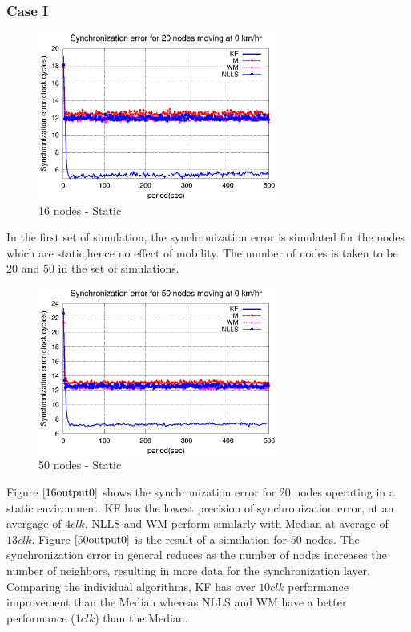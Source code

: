 \documentclass[a4paper,10pt]{report}
\begin{document}
\subsubsection{\textbf{Case I}}
\begin{figure}[!h]
\centering
\includegraphics[width=0.7\textwidth]{16output-s0}
\caption{16 nodes - Static} \label{16output0}
\end{figure}
In the first set of simulation, the synchronization error is simulated for the nodes which are static,hence no effect of mobility. The number of nodes is taken to be $20$ and $50$ in the set of simulations.  \newline
\begin{figure}
\centering
\includegraphics[width=0.7\textwidth]{50output-s0}
\caption{50 nodes - Static} \label{50output0}
\end{figure}
Figure $\ref{16output0}$ shows the synchronization error for $20$ nodes operating in a static environment. KF has the lowest
precision of synchronization error, at an avergage of $4clk$. NLLS and WM perform similarly with Median at average of $13clk$. \newline 
Figure $\ref{50output0}$ is the result of a simulation for $50$ nodes. The synchronization error in general reduces as the number of nodes increases the number of neighbors, resulting in more data for the synchronization layer. Comparing the individual algorithms, KF has over $10clk$ performance improvement than the Median whereas NLLS and WM have a better performance ($1clk$) than the Median.
\end{document}
